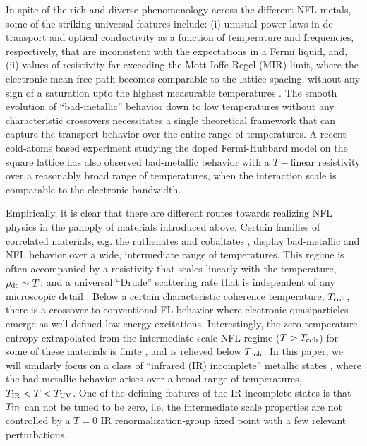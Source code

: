 \documentclass[aps,prx,onecolumn,amsmath,nofootinbib,amssymb,11pt]{revtex4-1}
\def \tn {\textnormal}
\begin{document}
In spite of the rich and diverse phenomenology across the different NFL metals, some of the striking universal features include: (i) unusual power-laws in dc transport  \cite{Takagi,allen,Tyler1998,gegenwart,Taillefer1,Ong1} and optical conductivity  \cite{CROopt,Marel03} as a function of temperature and frequencies, respectively, that are inconsistent with the expectations in a Fermi liquid, and, (ii) values of resistivity far exceeding the Mott-Ioffe-Regel (MIR) limit, where the electronic mean free path becomes comparable to the lattice spacing, without any sign of a saturation upto the highest measurable temperatures  \cite{Gunnarsson,Hussey04}. The smooth evolution of ``bad-metallic'' behavior \cite{SAK95} down to low temperatures without any characteristic crossovers necessitates a single theoretical framework that can capture the transport behavior over the entire range of temperatures. A recent cold-atoms based experiment studying the doped Fermi-Hubbard model on the square lattice has also observed bad-metallic behavior with a $T-$linear resistivity \cite{Bakr} over a reasonably broad range of temperatures, when the interaction scale is comparable to the electronic bandwidth. 


Empirically, it is clear that there are different routes towards realizing NFL physics in the panoply of materials introduced above. Certain families of correlated materials, e.g. the ruthenates \cite{allen,Tyler1998,gegenwart} and cobaltates \cite{Taillefer1,Ong1}, display bad-metallic and NFL behavior over a wide, intermediate range of temperatures. This regime is often accompanied by a resistivity that scales linearly with the temperature, $\rho_{\tn{dc}}\sim T$, and a universal ``Drude'' scattering rate that is independent of any microscopic detail \cite{Bruin13}. Below a certain characteristic coherence temperature, $T_{\tn{coh}}$, there is a crossover to conventional FL behavior where electronic quasiparticles emerge as well-defined low-energy excitations. Interestingly, the zero-temperature entropy extrapolated from the intermediate scale NFL regime ($T>T_{\tn{coh}}$) for some of these materials is finite \cite{allen,bruhwiler}, and is relieved below $T_{\tn{coh}}$. In this paper, we will similarly focus on a class of ``infrared (IR) incomplete'' metallic states \cite{DC2018}, where the bad-metallic behavior arises over a broad range of temperatures, $T_{\tn{IR}} < T < T_{\tn{UV}}$. One of the defining features of the IR-incomplete states is that $T_{\tn{IR}}$ can not be tuned to be zero, i.e. the intermediate scale properties are not controlled by a $T=0$ IR renormalization-group fixed point with a few relevant perturbations. 
\end{document}
